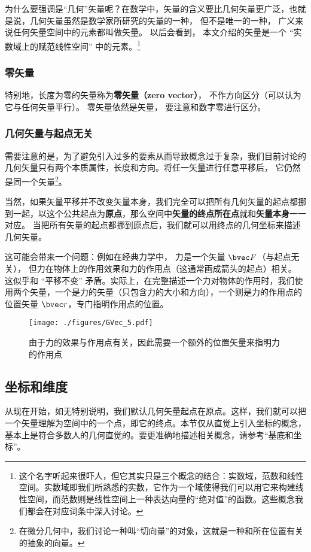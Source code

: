 为什么要强调是“几何”矢量呢？在数学中，矢量的含义要比几何矢量更广泛，也就是说，几何矢量虽然是数学家所研究的矢量的一种， 但不是唯一的一种， 广义来说任何矢量空间中的元素都叫做矢量。 以后会看到， 本文介绍的矢量是一个 “实数域上的赋范线性空间” 中的元素。\footnote{这个名字听起来很吓人，但它其实只是三个概念的结合：实数域，范数和线性空间。实数域即我们所熟悉的实数，它作为一个域使得我们可以用它来构建线性空间，而范数则是线性空间上一种表达向量的“绝对值”的函数。这些概念我们都会在对应词条中深入讨论。}

\subsubsection{零矢量}
特别地，长度为零的矢量称为\textbf{零矢量（zero vector）}， 不作方向区分（可以认为它与任何矢量平行）。 零矢量依然是矢量， 要注意和数字零进行区分。

\subsubsection{几何矢量与起点无关}
需要注意的是，为了避免引入过多的要素从而导致概念过于复杂，我们目前讨论的几何矢量只有两个本质属性，长度和方向。将任一矢量进行任意平移后， 它仍然是同一个矢量\footnote{在微分几何中，我们讨论一种叫“切向量”的对象，这就是一种和所在位置有关的抽象的向量。}。

当然，如果矢量平移并不改变矢量本身，我们完全可以把所有几何矢量的起点都挪到一起，以这个公共起点为\textbf{原点}，那么空间中\textbf{矢量的终点所在点}就和\textbf{矢量本身}一一对应。 当把所有矢量的起点都挪到原点后，我们就可以用终点的几何坐标来描述几何矢量。

这可能会带来一个问题：例如在经典力学中， 力是一个矢量 $\bvec F$（与起点无关）， 但力在物体上的作用效果和力的作用点（这通常画成箭头的起点）相关。 这似乎和 “平移不变” 矛盾。实际上，在完整描述一个力对物体的作用时，我们使用两个矢量，一个是力的矢量（只包含力的大小和方向），一个则是力的作用点的位置矢量 $\bvec r$，专门指明作用点的位置。
\begin{figure}[ht]
\centering
\texttt{[image: ./figures/GVec\_5.pdf]}
\caption{由于力的效果与作用点有关，因此需要一个额外的位置矢量来指明力的作用点} \label{GVec_fig5}
\end{figure}

\subsection{坐标和维度}
从现在开始，如无特别说明，我们默认几何矢量起点在原点。这样，我们就可以把一个矢量理解为空间中的一个点，即它的终点。本节仅从直觉上引入坐标的概念，基本上是符合多数人的几何直觉的。要更准确地描述相关概念，请参考“基底和坐标”。

